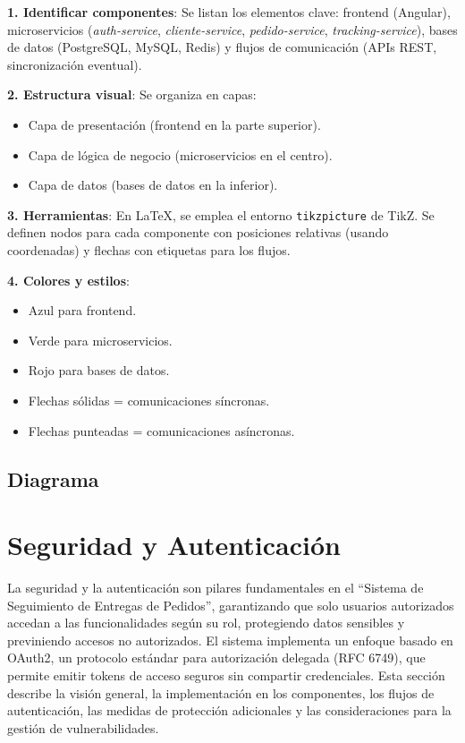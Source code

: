 \documentclass[a4paper,12pt]{article}
\begin{document}
\textbf{1. Identificar componentes}: Se listan los elementos clave: frontend (Angular), microservicios (\textit{auth-service}, \textit{cliente-service}, \textit{pedido-service}, \textit{tracking-service}), bases de datos (PostgreSQL, MySQL, Redis) y flujos de comunicación (APIs REST, sincronización eventual).

\textbf{2. Estructura visual}: Se organiza en capas: 
\begin{itemize}
    \item Capa de presentación (frontend en la parte superior).
    \item Capa de lógica de negocio (microservicios en el centro).
    \item Capa de datos (bases de datos en la inferior).
\end{itemize}

\textbf{3. Herramientas}: En LaTeX, se emplea el entorno \texttt{tikzpicture} de TikZ. Se definen nodos para cada componente con posiciones relativas (usando coordenadas) y flechas con etiquetas para los flujos.

\textbf{4. Colores y estilos}: 
\begin{itemize}
    \item Azul para frontend.
    \item Verde para microservicios.
    \item Rojo para bases de datos.
    \item Flechas sólidas = comunicaciones síncronas.
    \item Flechas punteadas = comunicaciones asíncronas.
\end{itemize}

\subsection{Diagrama}
\section{Seguridad y Autenticación}

La seguridad y la autenticación son pilares fundamentales en el ``Sistema de Seguimiento de Entregas de Pedidos'', garantizando que solo usuarios autorizados accedan a las funcionalidades según su rol, protegiendo datos sensibles y previniendo accesos no autorizados. El sistema implementa un enfoque basado en OAuth2, un protocolo estándar para autorización delegada (RFC 6749), que permite emitir tokens de acceso seguros sin compartir credenciales. Esta sección describe la visión general, la implementación en los componentes, los flujos de autenticación, las medidas de protección adicionales y las consideraciones para la gestión de vulnerabilidades.
\end{document}
